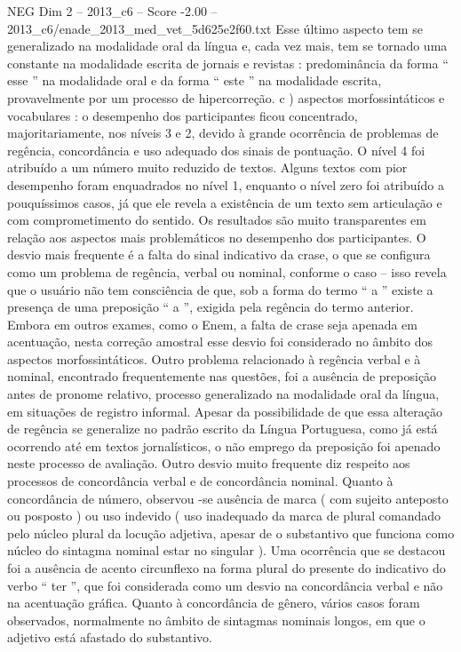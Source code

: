 \begin{textsample}{NEG Dim 2 – 2013\_c6 – Score -2.00 – 2013\_c6/enade\_2013\_med\_vet\_5d625e2f60.txt}
Esse último aspecto tem se generalizado na modalidade oral da língua e, cada vez mais, tem se tornado uma constante na modalidade escrita de jornais e revistas : predominância da forma “ esse ” na modalidade oral e da forma “ este ” na modalidade escrita, provavelmente por um processo de hipercorreção. c ) aspectos morfossintáticos e vocabulares : o desempenho dos participantes ficou concentrado, majoritariamente, nos níveis 3 e 2, devido à grande ocorrência de problemas de regência, concordância e uso adequado dos sinais de pontuação.
O nível 4 foi atribuído a um número muito reduzido de textos.
Alguns textos com pior desempenho foram enquadrados no nível 1, enquanto o nível zero foi atribuído a pouquíssimos casos, já que ele revela a existência de um texto sem articulação e com comprometimento do sentido.
Os resultados são muito transparentes em relação aos aspectos mais problemáticos no desempenho dos participantes.
O desvio mais frequente é a falta do sinal indicativo da crase, o que se configura como um problema de regência, verbal ou nominal, conforme o caso – isso revela que o usuário não tem consciência de que, sob a forma do termo “ a ” existe a presença de uma preposição “ a ”, exigida pela regência do termo anterior.
Embora em outros exames, como o Enem, a falta de crase seja apenada em acentuação, nesta correção amostral esse desvio foi considerado no âmbito dos aspectos morfossintáticos.
Outro problema relacionado à regência verbal e à nominal, encontrado frequentemente nas questões, foi a ausência de preposição antes de pronome relativo, processo generalizado na modalidade oral da língua, em situações de registro informal.
Apesar da possibilidade de que essa alteração de regência se generalize no padrão escrito da Língua Portuguesa, como já está ocorrendo até em textos jornalísticos, o não emprego da preposição foi apenado neste processo de avaliação.
Outro desvio muito frequente diz respeito aos processos de concordância verbal e de concordância nominal.
Quanto à concordância de número, observou -se ausência de marca ( com sujeito anteposto ou posposto ) ou uso indevido ( uso inadequado da marca de plural comandado pelo núcleo plural da locução adjetiva, apesar de o substantivo que funciona como núcleo do sintagma nominal estar no singular ).
Uma ocorrência que se destacou foi a ausência de acento circunflexo na forma plural do presente do indicativo do verbo “ ter ”, que foi considerada como um desvio na concordância verbal e não na acentuação gráfica.
Quanto à concordância de gênero, vários casos foram observados, normalmente no âmbito de sintagmas nominais longos, em que o adjetivo está afastado do substantivo.

\end{textsample}
